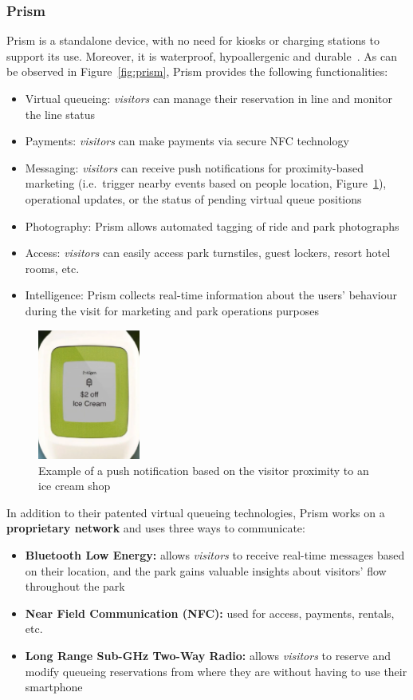 \subsubsection*{Prism}
Prism is a standalone device, with no need for kiosks or charging stations to support its use.
Moreover, it is waterproof, hypoallergenic and durable~\cite{prism-desc}.
As can be observed in Figure~\ref{fig:prism}, Prism provides the following functionalities:
\begin{itemize}
	\item Virtual queueing: \textit{visitors} can manage their reservation in line and monitor the line status
	\item Payments: \textit{visitors} can make payments via secure NFC technology
	\item Messaging: \textit{visitors} can receive push notifications for proximity-based marketing (i.e.\ trigger nearby events based on people location, Figure~\ref{fig:prism-icecream}), operational updates, or the status of pending virtual queue positions
	\item Photography: Prism allows automated tagging of ride and park photographs
	\item Access: \textit{visitors} can easily access park turnstiles, guest lockers, resort hotel rooms, etc.
	\item Intelligence: Prism collects real-time information about the users' behaviour during the visit for marketing and park operations purposes
\end{itemize}

\begin{figure}[H]
	\centering
	\includegraphics[width=0.3\textwidth]{img/prism-icecream}
	\caption{Example of a push notification based on the visitor proximity to an ice cream shop}
	\label{fig:prism-icecream}
\end{figure}

In addition to their patented virtual queueing technologies, Prism works on a \textbf{proprietary network} and uses three ways to communicate:
\begin{itemize}
	\item \textbf{Bluetooth Low Energy:} allows \textit{visitors} to receive real-time messages based on their location, and the park gains valuable insights about visitors' flow throughout the park
	\item \textbf{Near Field Communication (NFC):} used for access, payments, rentals, etc.
	\item \textbf{Long Range Sub-GHz Two-Way Radio:} allows \textit{visitors} to reserve and modify queueing reservations from where they are without having to use their smartphone
\end{itemize}

